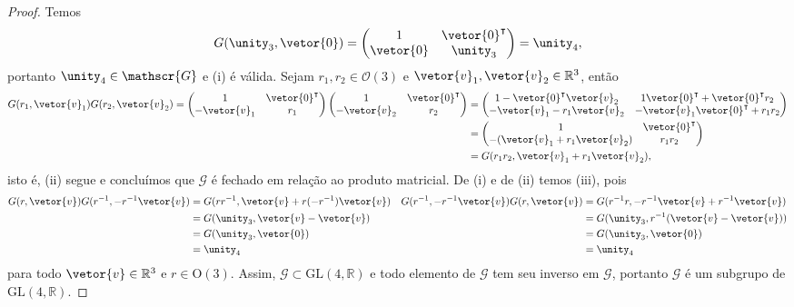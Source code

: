 \begin{proof}
    Temos
    \begin{equation*}
        G(\unity_3, \vetor{0}) = \begin{pmatrix}
            1 & \vetor{0}^\intercal\\
            \vetor{0} & \unity_3
        \end{pmatrix} = \unity_4,
    \end{equation*}
    portanto \(\unity_4 \in \mathscr{G}\) e (i) é válida. Sejam \(r_1, r_2 \in \mathscr{O}(3)\) e \(\vetor{v}_1, \vetor{v}_2 \in \mathbb{R}^3\), então
    \begin{align*}
        G(r_1, \vetor{v}_1)G(r_2, \vetor{v}_2)
        =
        \begin{pmatrix}
            1 & \vetor{0}^\intercal\\
            -\vetor{v}_1 & r_1
        \end{pmatrix}
        \begin{pmatrix}
            1 & \vetor{0}^\intercal\\
            -\vetor{v}_2 & r_2
        \end{pmatrix}
        &=
        \begin{pmatrix}
            1 - \vetor{0}^\intercal\vetor{v}_2 & 1\vetor{0}^\intercal + \vetor{0}^\intercal r_2\\
            -\vetor{v}_1 - r_1 \vetor{v}_2 & -\vetor{v}_1\vetor{0}^\intercal + r_1 r_2
        \end{pmatrix}\\
        &=
        \begin{pmatrix}
            1 & \vetor{0}^\intercal\\
            -(\vetor{v}_1 + r_1 \vetor{v}_2) & r_1 r_2
        \end{pmatrix}\\
        &= G(r_1r_2,\vetor{v}_1 + r_1 \vetor{v}_2),
    \end{align*}
    isto é, (ii) segue e concluímos que \(\mathscr{G}\) é fechado em relação ao produto matricial. De (i) e de (ii) temos (iii), pois
    \begin{align*}
        G(r, \vetor{v})G(r^{-1}, -r^{-1}\vetor{v})
        &= G(r r^{-1}, \vetor{v} + r(-r^{-1})\vetor{v})&
        G(r^{-1}, -r^{-1}\vetor{v})G(r, \vetor{v})
        &= G(r^{-1} r, -r^{-1}\vetor{v} + r^{-1}\vetor{v})\\
        &= G(\unity_3, \vetor{v} - \vetor{v})&
        &= G(\unity_3, r^{-1}(\vetor{v} - \vetor{v}))\\
        &= G(\unity_3, \vetor{0})&
        &= G(\unity_3, \vetor{0})\\
        &= \unity_4&
        &= \unity_4
    \end{align*}
    para todo \(\vetor{v} \in \mathbb{R}^3\) e \(r \in \mathrm{O}(3)\). Assim, \(\mathscr{G}\subset \mathrm{GL}(4, \mathbb{R})\) e todo elemento de \(\mathscr{G}\) tem seu inverso em \(\mathscr{G}\), portanto \(\mathscr{G}\) é um subgrupo de \(\mathrm{GL}(4, \mathbb{R})\).
\end{proof}

